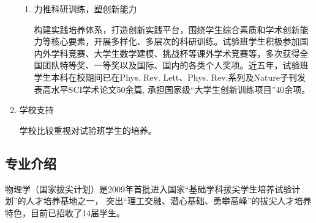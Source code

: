\documentclass[zihao=-4,fontset=none]{Beautybook-CN}
\begin{document}
\begin{enumerate}
\begin{enumerate}
	      	\item 力推科研训练，塑创新能力
	      	      
	      	      构建实践培养体系，打造创新实践平台，围绕学生综合素质和学术创新能力等核心要素，开展多样化、多层次的科研训练。试验班学生积极参加国内外学科竞赛、大学生数学建模、挑战杯等课外学术竞赛等，多次获得全国团队特等奖、一等奖以及国际、国内的各类个人奖项。近五年，试验班学生本科在校期间已在Phys. Rev. Lett、Phys. Rev.系列及Nature子刊发表高水平SCI学术论文50余篇, 承担国家级“大学生创新训练项目”40余项。
	      \end{enumerate} 	          
	      	              
	\item 学校支持
	      	      
	      学校比较重视对试验班学生的培养。
\end{enumerate}

\subsection{专业介绍}

物理学（国家拔尖计划）是2009年首批进入国家“基础学科拔尖学生培养试验计划”的人才培养基地之一， 突出“理工交融、潜心基础、勇攀高峰”的拔尖人才培养特色，目前已招收了14届学生。
\end{document}
